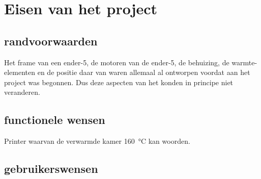 \chapter{Eisen van het project}
\label{Eisen_van_het_project}

\section{randvoorwaarden}

Het frame van een ender-5, de motoren van de ender-5, de behuizing, de
warmte-elementen en de positie daar van waren allemaal al ontworpen voordat aan
het project was begonnen. Dus deze aspecten van het konden in principe niet
veranderen.

\section{functionele wensen}

Printer waarvan de verwarmde kamer \SI{160}{\celsius} kan woorden.


\section{gebruikerswensen}

